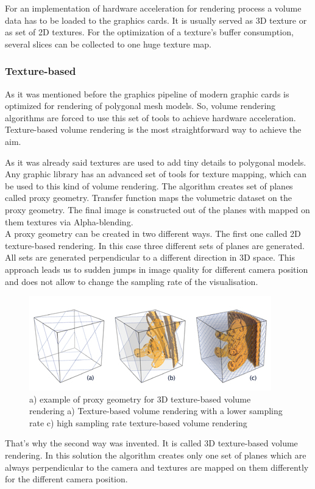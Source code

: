 \documentclass[twoside, english, 11pt]{report}
\begin{document}
For an implementation of hardware acceleration for rendering process a volume data has to be loaded to the graphics cards. It is usually served as 3D texture or as set of 2D textures. For the optimization of a texture's buffer consumption, several slices can be collected to one huge texture map. 
\subsubsection{Texture-based}

As it was mentioned before the graphics pipeline of modern graphic cards is optimized for rendering of polygonal mesh models. So, volume rendering algorithms are forced to use this set of tools to achieve hardware acceleration. Texture-based volume rendering is the most straightforward way to achieve the aim.\

As it was already said textures are used to add tiny details to polygonal models. Any graphic library has an advanced set of tools for texture mapping, which can be used to this kind of volume rendering. The algorithm creates set of planes called proxy geometry. Transfer function maps the volumetric dataset on the proxy geometry. The final image is constructed out of the planes with mapped on them textures via Alpha-blending.\\

A proxy geometry can be created in two different ways. The first one called 2D texture-based rendering. In this case three different sets of planes are generated. All sets are generated perpendicular to a different direction in 3D space. This approach leads us to sudden jumps in image quality for different camera position and does not allow to change the sampling rate of the visualisation.\\
\begin{figure}[!h]
\centerline{
\includegraphics[scale=0.7]{img/texture-based}
}
\caption{a) example of proxy geometry for 3D texture-based volume rendering a) Texture-based volume rendering with a lower sampling rate c) high sampling rate texture-based volume rendering}
\end{figure}
That's why the second way was invented. It is called 3D texture-based volume rendering. In this solution the algorithm creates only one set of planes which are always perpendicular to the camera and textures are mapped on them differently for the different camera position. \\
\end{document}
